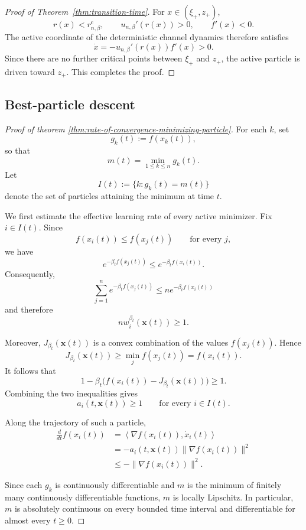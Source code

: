 \documentclass{article}
\theoremstyle{plain}
\theoremstyle{definition}
\theoremstyle{remark}
\begin{document}
\begin{proof}[Proof of Theorem~\ref{thm:transition-time}]
For \(x\in(\xi_+,z_+)\),
\[
    r(x)<r_{n,\beta}^{\mathrm c},
    \qquad
    u_{n,\beta}'(r(x))>0,
    \qquad
    f'(x)<0.
\]
The active coordinate of the deterministic channel dynamics therefore satisfies
\[
    \dot x
    =
    -u_{n,\beta}'(r(x))f'(x)
    >0.
\]
Since there are no further critical points between \(\xi_+\) and \(z_+\), the active particle is driven toward \(z_+\). This completes the proof.
\end{proof}
\subsection{Best-particle descent}

\begin{proof}[Proof of theorem \ref{thm:rate-of-convergence-minimizing-particle}]
For each \(k\), set
\[
    g_k(t):=f(x_k(t)),
\]
so that
\[
    m(t)=\min_{1\le k\le n}g_k(t).
\]
Let
\[
    I(t):=\{k:g_k(t)=m(t)\}
\]
denote the set of particles attaining the minimum at time \(t\).

We first estimate the effective learning rate of every active minimizer. Fix \(i\in I(t)\). Since
\[
    f(x_i(t))\le f(x_j(t)) \qquad\text{for every }j,
\]
we have
\[
    e^{-\beta_t f(x_j(t))} \le e^{-\beta_t f(x_i(t))}.
\]
Consequently,
\[
    \sum_{j=1}^n e^{-\beta_t f(x_j(t))} \le n e^{-\beta_t f(x_i(t))}
\]
and therefore
\[
    n w_i^{\beta_t}(\mathbf x(t))\ge1.
\]

Moreover, \(J_{\beta_t}(\mathbf x(t))\) is a convex combination of the values \(f(x_j(t))\). Hence
\[
    J_{\beta_t}(\mathbf x(t)) \ge \min_j f(x_j(t)) = f(x_i(t)).
\]
It follows that
\[
    1-\beta_t  \bigl(f(x_i(t))-J_{\beta_t}(\mathbf x(t))\bigr) \ge1.
\]
Combining the two inequalities gives
\[
    a_i(t,\mathbf x(t))\ge1 \qquad\text{for every }i\in I(t).
\]

Along the trajectory of such a particle,
\[
    \begin{aligned}
        \frac{d}{dt}f(x_i(t)) &= \left\langle \nabla f(x_i(t)),\dot x_i(t) \right\rangle \\
        &= -a_i(t,\mathbf x(t)) \|\nabla f(x_i(t))\|^2 \\
        &\le -\|\nabla f(x_i(t))\|^2.
    \end{aligned}
\]

Since each \(g_k\) is continuously differentiable and \(m\) is the minimum of finitely many continuously differentiable functions, \(m\) is locally Lipschitz. In particular, \(m\) is absolutely continuous on every bounded time interval and differentiable for almost every \(t\ge0\).


\end{proof}
\end{document}

